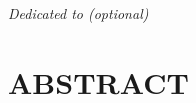 \documentclass[10pt]{report}
\begin{document}
\newenvironment{preliminary}{}{}
\titleformat{\chapter}[hang]{\large\center}{\thechapter}{0 pt}{}
\titlespacing*{\chapter}{0pt}{-33 pt}{6 pt} %
\begin{preliminary}

\setcounter{page}{3}  %
\begin{center}
\textit{Dedicated to (optional)}
\end{center}


% 


\clearpage
\chapter*{ABSTRACT}
\begin{center}
\mytitle

\myauthor

\mysupervisorname

\end{center}



\clearpage
\tableofcontents





\end{preliminary}
\end{document}
